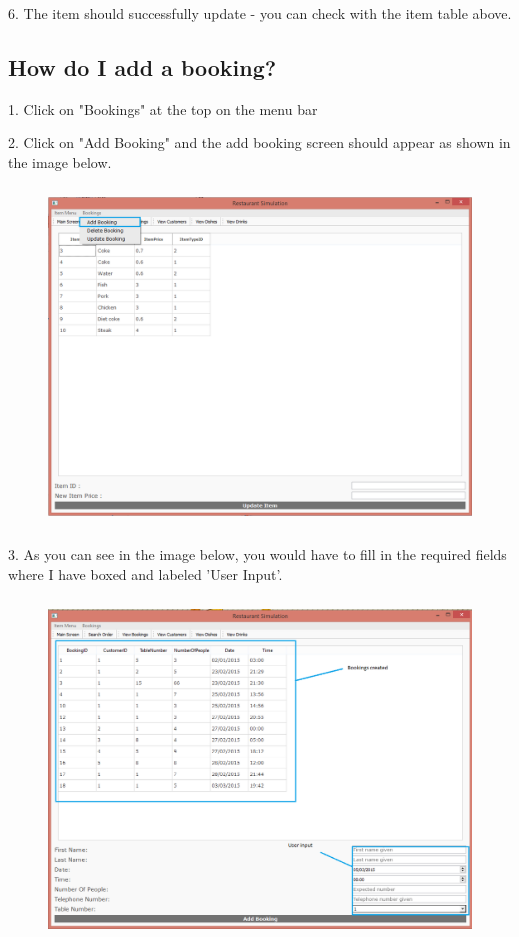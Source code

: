 6. The item should successfully update - you can check with the item table above.

\subsection{How do I add a booking?}
1. Click on "Bookings" at the top on the menu bar

2. Click on "Add Booking" and the add booking screen should appear as shown in the image below.

\begin{figure}[H]
    \includegraphics[height = 9cm]{./Manual/images/AddBooking1} 
    \caption{} \label{fig:addbooking1}
\end{figure}

3. As you can see in the image below, you would have to fill in the required fields where I have boxed and labeled 'User Input'.

\begin{figure}[H]
    \includegraphics[height = 9cm]{./Manual/images/AddBooking2} 
    \caption{} \label{fig:addbooking2}
\end{figure}

